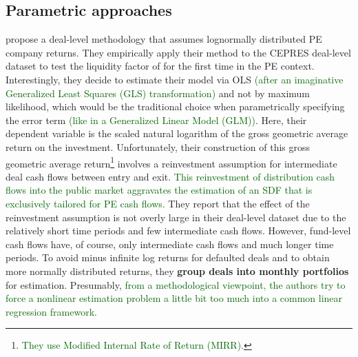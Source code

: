 \subsection{Parametric approaches}

\cite{FNP12} propose a deal-level methodology that assumes lognormally distributed PE company returns.
They empirically apply their method to the CEPRES deal-level dataset to test the liquidity factor of \cite{PS03} for the first time in the PE context.
Interestingly, they decide to estimate their model via OLS \textcolor{darkgreen}{(after an imaginative Generalized Least Squares (GLS) transformation)} and not by maximum likelihood, which would be the traditional choice when parametrically specifying the error term \textcolor{darkgreen}{(like in a Generalized Linear Model (GLM))}.
Here, their dependent variable is the scaled natural logarithm of the gross geometric average return on the investment.
Unfortunately, their construction of this gross geometric average return\footnote{\textcolor{darkgreen}{They use Modified Internal Rate of Return (MIRR).}} involves a reinvestment assumption for intermediate deal cash flows between entry and exit.
\textcolor{darkgreen}{This reinvestment of distribution cash flows into the public market aggravates the estimation of an SDF that is exclusively tailored for PE cash flows.}
They report that the effect of the reinvestment assumption is not overly large in their deal-level dataset due to the relatively short time periods and few intermediate cash flows.
However, fund-level cash flows have, of course, only intermediate cash flows and much longer time periods. 
To avoid minus infinite log returns for defaulted deals and to obtain more normally distributed returns, they \textbf{group deals into monthly portfolios} for estimation.
Presumably, \textcolor{darkgreen}{from a methodological viewpoint, the authors try to force a nonlinear estimation problem a little bit too much into a common linear regression framework.}

